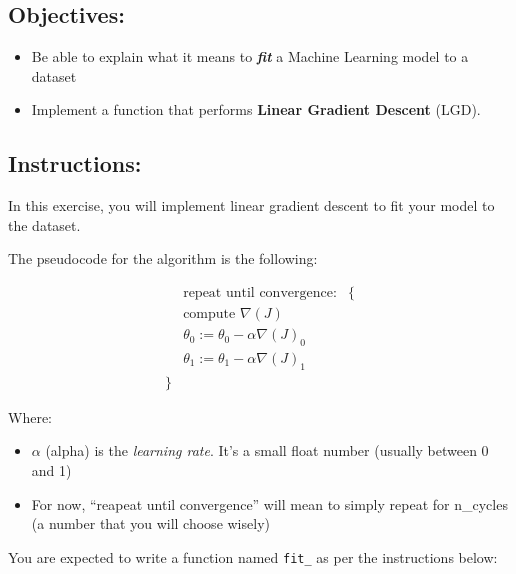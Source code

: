 \documentclass[]{article}
\begin{document}
\hypertarget{objectives-4}{%
\subsection{Objectives:}\label{objectives-4}}

\begin{itemize}
\item
  Be able to explain what it means to \textbf{\emph{fit}} a Machine
  Learning model to a dataset
\item
  Implement a function that performs \textbf{Linear Gradient Descent}
  (LGD).
\end{itemize}

\hypertarget{instructions-4}{%
\subsection{Instructions:}\label{instructions-4}}

In this exercise, you will implement linear gradient descent to fit your
model to the dataset.

The pseudocode for the algorithm is the following:

\large

\[
\begin{matrix}
&\text{repeat until convergence:} & \{ \\
&   \text{compute } \nabla{(J)}  \\
&   \theta_0 := \theta_0 - \alpha \nabla(J)_0  \\ 
&   \theta_1 := \theta_1 - \alpha \nabla(J)_1\\
    \} 
\end{matrix}
\] \normalsize

Where:

\begin{itemize}
\item
  \(\alpha\) (alpha) is the \emph{learning rate}. It's a small float
  number (usually between 0 and 1)
\item
  For now, ``reapeat until convergence'' will mean to simply repeat for
  n\_cycles (a number that you will choose wisely)
\end{itemize}

You are expected to write a function named \texttt{fit\_} as per the
instructions below:
\end{document}
